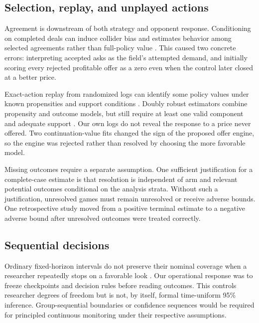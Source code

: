 \subsection{Selection, replay, and unplayed actions}

Agreement is downstream of both strategy and opponent response. Conditioning
on completed deals can induce collider bias and estimates behavior among
selected agreements rather than full-policy value
\citep{elwert2014selection}. This caused two concrete errors: interpreting
accepted asks as the field's attempted demand, and initially scoring every
rejected profitable offer as a zero even when the control later closed at a
better price.

Exact-action replay from randomized logs can identify some policy values under
known propensities and support conditions \citep{li2011offline}. Doubly robust
estimators combine propensity and outcome models, but still require at least
one valid component and adequate support \citep{dudik2014doubly}. Our own logs
do not reveal the response to a price never offered. Two continuation-value
fits changed the sign of the proposed offer engine, so the engine was rejected
rather than resolved by choosing the more favorable model.

Missing outcomes require a separate assumption. One sufficient justification
for a complete-case estimate is that resolution is independent of arm and
relevant potential outcomes conditional on the analysis strata. Without such a
justification, unresolved games must remain unresolved or receive adverse
bounds. One retrospective study moved from a
positive terminal estimate to a negative adverse bound after unresolved
outcomes were treated correctly.

\subsection{Sequential decisions}

Ordinary fixed-horizon intervals do not preserve their nominal coverage when a
researcher repeatedly stops on a favorable look \citep{johari2017peeking}.
Our operational response was to freeze checkpoints and decision rules before
reading outcomes. This controls researcher degrees of freedom but is not, by
itself, formal time-uniform 95\% inference. Group-sequential boundaries
\citep{pocock1977group} or confidence sequences
\citep{howard2021confidence} would be required for principled continuous
monitoring under their respective assumptions.

